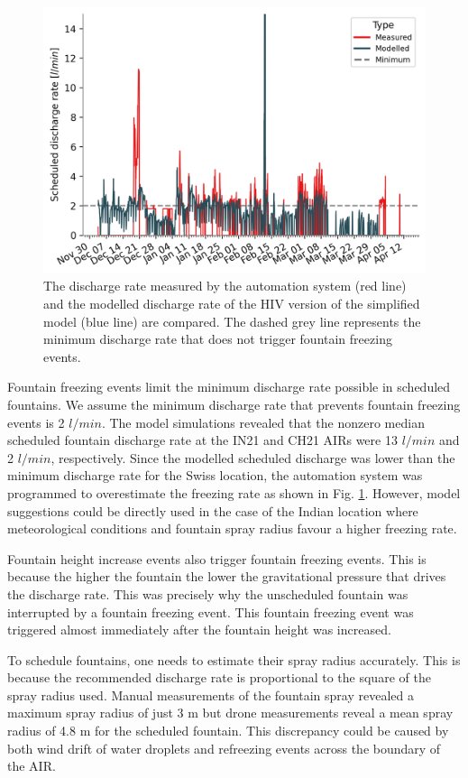 \documentclass[tc, manuscript]{copernicus}
\begin{document}
\begin{figure}[t]
\includegraphics[width=12cm]{Figures/simvsreal.png}

\caption{ The discharge rate measured by the automation system (red line) and the modelled discharge rate of the HIV version
  of the simplified model (blue line) are compared. The dashed grey line represents the minimum discharge rate
that does not trigger fountain freezing events. }

\label{fig:simvsreal}
\end{figure}

Fountain freezing events limit the minimum discharge rate possible in scheduled fountains.  We assume the
minimum discharge rate that prevents fountain freezing events is 2 $l/min$. The model simulations revealed that
the nonzero median scheduled fountain discharge rate at the IN21 and CH21 AIRs were 13 $l/min$ and 2 $l/min$,
respectively. Since the modelled scheduled discharge was lower than the minimum discharge rate for the Swiss
location, the automation system was programmed to overestimate the freezing rate as shown in Fig.
\ref{fig:simvsreal}. However, model suggestions could be directly used in the case of the Indian location where
meteorological conditions and fountain spray radius favour a higher freezing rate. 

Fountain height increase events also trigger fountain freezing events. This is because the higher the fountain
the lower the gravitational pressure that drives the discharge rate. This was precisely why the unscheduled
fountain was interrupted by a fountain freezing event. This fountain freezing event was triggered almost
immediately after the fountain height was increased. 

To schedule fountains, one needs to estimate their spray radius accurately. This is because the recommended
discharge rate is proportional to the square of the spray radius used.  Manual measurements of the fountain spray revealed a
maximum spray radius of just 3 m but drone measurements reveal a mean spray radius of 4.8 m for the scheduled
fountain. This discrepancy could be caused by both wind drift of water droplets and refreezing events across the
boundary of the AIR. 
\end{document}
